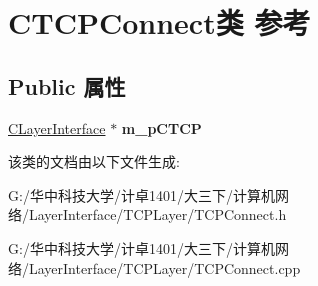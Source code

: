 \hypertarget{class_c_t_c_p_connect}{}\section{C\+T\+C\+P\+Connect类 参考}
\label{class_c_t_c_p_connect}
\subsection*{Public 属性}
\begin{DoxyCompactItemize}
\item 
\mbox{\label{class_c_t_c_p_connect_a0418f1607ff29af6941d080cf5896df7}} 
\hyperlink{class_c_layer_interface}{C\+Layer\+Interface} $\ast$ {\bfseries m\+\_\+p\+C\+T\+CP}
\end{DoxyCompactItemize}


该类的文档由以下文件生成\+:\begin{DoxyCompactItemize}
\item 
G\+:/华中科技大学/计卓1401/大三下/计算机网络/\+Layer\+Interface/\+T\+C\+P\+Layer/T\+C\+P\+Connect.\+h\item 
G\+:/华中科技大学/计卓1401/大三下/计算机网络/\+Layer\+Interface/\+T\+C\+P\+Layer/T\+C\+P\+Connect.\+cpp\end{DoxyCompactItemize}
